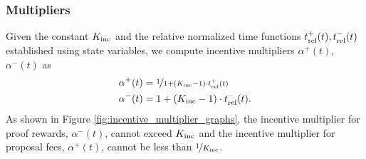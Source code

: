 \subsubsection{Multipliers}
Given the constant $K_\textnormal{inc}$  %
and the relative normalized time functions $t^+_\textnormal{rel}(t), t^-_\textnormal{rel}(t)$ established using state variables, we compute incentive multipliers $\alpha^+(t)$, $\alpha^-(t)$ as
\begin{align}
\alpha^+(t) &= \nicefrac{1}{1 + (K_\textnormal{inc} - 1)\cdot t_\textnormal{rel}^+(t)}\\
\alpha^-(t) &= 1 + (K_\textnormal{inc} - 1)\cdot t_\textnormal{rel}^-(t).
\end{align}
As shown in Figure \ref{fig:incentive_multiplier_graphs}, the incentive multiplier for proof rewards, $\alpha^-(t)$, cannot exceed $K_\textnormal{inc}$ and the incentive multiplier for proposal fees, $\alpha^+(t)$, cannot be less than $\nicefrac{1}{K_\textnormal{inc}}$.

